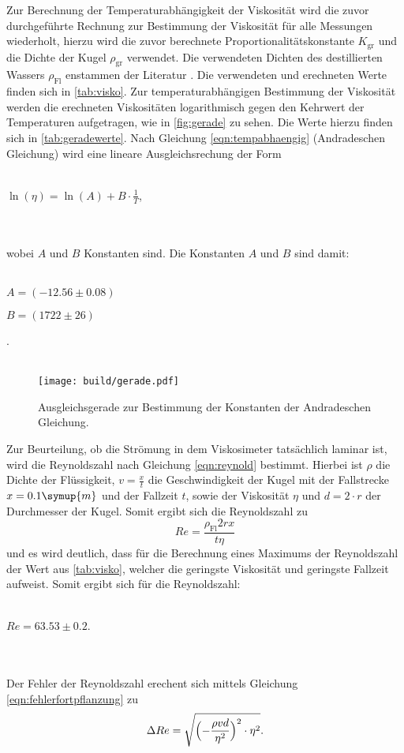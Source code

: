 Zur Berechnung der Temperaturabhängigkeit der Viskosität wird die zuvor durchgeführte Rechnung zur Bestimmung der Viskosität für
alle Messungen wiederholt, hierzu wird die zuvor berechnete Proportionalitätskonstante $K_\text{gr}$ und die Dichte der Kugel $\rho_\text{gr}$ verwendet. Die verwendeten Dichten 
des destillierten Wassers $\rho_\text{Fl}$ enstammen der Literatur \cite{science}.
Die verwendeten und erechneten Werte finden sich in \autoref{tab:visko}.
Zur temperaturabhängigen Bestimmung der Viskosität werden die erechneten Viskositäten logarithmisch gegen den Kehrwert der Temperaturen aufgetragen, wie in \autoref{fig:gerade} zu sehen.
Die Werte hierzu finden sich in \autoref{tab:geradewerte}. Nach Gleichung \eqref{eqn:tempabhaengig} (Andradeschen Gleichung) wird eine lineare Ausgleichsrechung der Form
\\ \\
\centerline{$\ln(\eta) = \ln(A) + B \cdot \frac{1}{T}$,}
\\ \\
wobei $A$ und $B$ Konstanten sind.
Die Konstanten $A$ und $B$ sind damit:
\\ \\
\centerline{$A = (-12.56 \pm 0.08)$}
\centerline{$B = (1722 \pm 26 )$}.
\\ \\


\begin{figure}
  \centering
  \texttt{[image: build/gerade.pdf]}
  \caption{Ausgleichsgerade zur Bestimmung der Konstanten der Andradeschen Gleichung.}
  \label{fig:gerade}
\end{figure}
Zur Beurteilung, ob die Strömung in dem Viskosimeter tatsächlich laminar ist, wird die Reynoldszahl nach Gleichung \eqref{eqn:reynold} bestimmt.
Hierbei ist $\rho$ die Dichte der Flüssigkeit, $v= \frac{x}{t}$ die Geschwindigkeit der Kugel mit der Fallstrecke $x=0.1 \symup{m}$ und der Fallzeit $t$, sowie der 
Viskosität $\eta$ und $d = 2\cdot r$ der Durchmesser der Kugel. Somit ergibt sich die Reynoldszahl zu 
\begin{equation}
Re = \frac{\rho_\text{Fl} 2r x}{t \eta}
\end{equation}
und es wird deutlich, dass für die Berechnung eines Maximums der Reynoldszahl der Wert aus \autoref{tab:visko}, welcher die geringste Viskosität und geringste Fallzeit aufweist.
Somit ergibt sich für die Reynoldszahl:
\\ \\
\centerline{$ Re = 63.53 \pm 0.2$.}
\\ \\
Der Fehler der Reynoldszahl erechent sich mittels Gleichung \eqref{eqn:fehlerfortpflanzung} zu
\begin{equation}
\Delta Re = \sqrt{\Bigl(- \frac{\rho v d}{\eta^2}\Bigr)^2 \cdot \eta^2}.
\end{equation}

